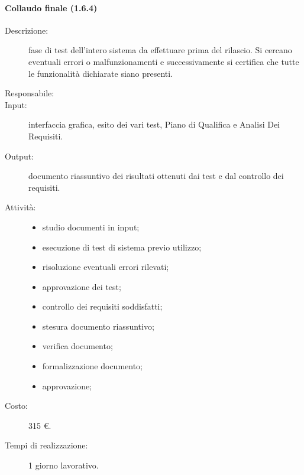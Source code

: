 \paragraph{Collaudo finale (1.6.4)}
\begin{description}
\item[Descrizione:] fase di test dell'intero sistema da effettuare prima del rilascio. Si cercano eventuali errori o malfunzionamenti e successivamente si certifica che tutte le funzionalità dichiarate siano presenti.
\item[Responsabile:] 
\item[Input:] interfaccia grafica, esito dei vari test, Piano di Qualifica e Analisi Dei Requisiti.
\item[Output:] documento riassuntivo dei risultati ottenuti dai test e dal controllo dei requisiti.
\item[Attività:] 
\begin{center}
\begin{itemize}
\item studio documenti in input;
\item esecuzione di test di sistema previo utilizzo;
\item risoluzione eventuali errori rilevati;
\item approvazione dei test;
\item controllo dei requisiti soddisfatti;
\item stesura documento riassuntivo;
\item verifica documento;
\item formalizzazione documento;
\item approvazione;
\end{itemize}
\end{center}
\item[Costo:] 315 \euro{}.
\item[Tempi di realizzazione:] 1 giorno lavorativo.
\end{description}

